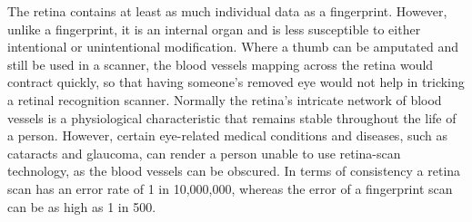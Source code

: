 The retina contains at least as much individual data as a fingerprint. 
However, unlike a fingerprint, it is an internal organ and is less susceptible
to either intentional or unintentional modification. Where a thumb can be
amputated and still be used in a scanner, the blood vessels mapping across
the retina would contract quickly, so that having someone's removed eye
would not help in tricking a retinal recognition scanner. Normally the retina's
intricate network of blood vessels is a physiological characteristic that
remains stable throughout the life of a person. However, certain eye-related
medical conditions and diseases, such as cataracts and glaucoma, can render
a person unable to use retina-scan technology, as the blood vessels can
be obscured.\cite{rarr_2015}  In terms of consistency a retina scan has an
error rate of 1 in 10,000,000, whereas the error of a fingerprint scan can be as
high as 1 in 500.

